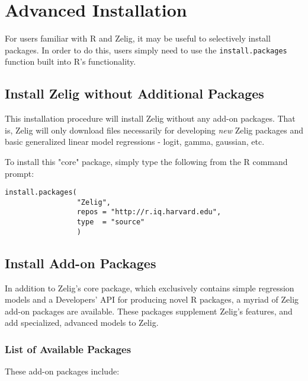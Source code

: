 %
%
\section{Advanced Installation}

For users familiar with R and Zelig, it may be useful to selectively install packages. In order to do this, users simply need to use the {\tt install.packages} function built into R's functionality.

\subsection{Install Zelig without Additional Packages}
This installation procedure will install Zelig without any add-on packages. That is, Zelig will only download files necessarily for developing \emph{new} Zelig packages and basic generalized linear model regressions - logit, gamma, gaussian, etc.

To install this "core" package, simply type the following from the R command prompt:
\begin{verbatim}
install.packages(
                 "Zelig",
                 repos = "http://r.iq.harvard.edu",
                 type  = "source"
                 )
\end{verbatim}

\subsection{Install Add-on Packages}

In addition to Zelig's core package, which exclusively contains simple regression models and a Developers' API for producing novel R packages, a myriad of Zelig add-on packages are available. These packages supplement Zelig's features, and add specialized, advanced models to Zelig.

\subsubsection{List of Available Packages}
These add-on packages include:

